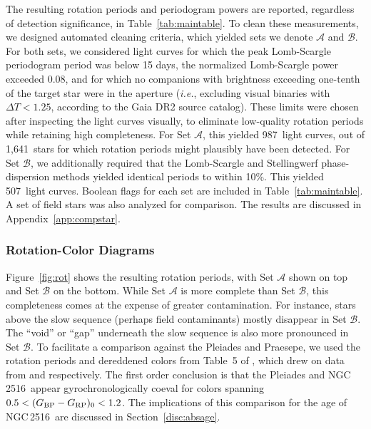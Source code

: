 \documentclass[12pt,twocolumn,tighten]{aastex63}
\newcommand{\cn}{NGC\,2516} %
\newcommand{\nautorotdenominator}{1{,}641} %
\newcommand{\nautorotnumerator}{987} %
\newcommand{\nautorotnumeratormatching}{507} %
\newcommand{\bpmrpo}{(G_{\rm BP}-G_{\rm RP})_0}
\begin{document}
The resulting rotation periods and periodogram powers are reported,
regardless of detection significance, in Table~\ref{tab:maintable}.
To clean these measurements, we designed 
automated cleaning criteria, which yielded sets we denote
$\mathcal{A}$ and $\mathcal{B}$.  For both sets, we considered light
curves for which the peak Lomb-Scargle periodogram period was below 15
days, the normalized Lomb-Scargle power exceeded 0.08, and for which
no companions with brightness exceeding one-tenth of the target star
were in the aperture ({\it i.e.}, excluding visual binaries
with $\Delta T < 1.25$, according to the Gaia DR2 source catalog).
These limits were chosen after inspecting the light curves visually,
to eliminate low-quality rotation periods while retaining high
completeness.  For Set $\mathcal{A}$, this yielded \nautorotnumerator\
light curves, out of \nautorotdenominator\ stars for which rotation
periods might plausibly have been detected.  For Set $\mathcal{B}$, we
additionally required that the Lomb-Scargle and Stellingwerf
phase-dispersion methods yielded identical periods to within 10\%.
This yielded \nautorotnumeratormatching\ light curves.  Boolean flags
for each set are included in Table~\ref{tab:maintable}.
A set of field stars was also analyzed for comparison.
The results are discussed in Appendix~\ref{app:compstar}.

\subsubsection{Rotation-Color Diagrams}

Figure~\ref{fig:rot} shows the resulting rotation
periods, with Set $\mathcal{A}$ shown on top and Set $\mathcal{B}$ on
the bottom.  While Set $\mathcal{A}$ is more complete than Set
$\mathcal{B}$, this completeness comes at the expense of greater
contamination.  For instance, stars above the slow sequence (perhaps
field contaminants) mostly disappear in Set $\mathcal{B}$.  The
``void'' or ``gap'' underneath the slow sequence is also more
pronounced in Set $\mathcal{B}$.  To facilitate a comparison against
the Pleiades and Praesepe, we used the rotation periods and dereddened
colors from Table~5 of \citet{curtis_rup147_2020}, which drew on data
from \citet{rebull_rotation_2016a} and \citet{douglas_k2_2019}
respectively.  The first order conclusion is that the Pleiades and
\cn\ appear gyrochronologically coeval for colors spanning
$0.5<\bpmrpo<1.2$.  The implications of this comparison for the age of
\cn\ are discussed in Section~\ref{disc:absage}.
\end{document}
